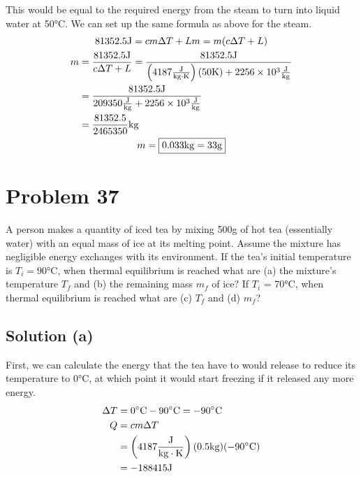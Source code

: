 \documentclass[12pt]{article}
\begin{document}
        This would be equal to the required energy from the steam to turn into liquid water at 50\unit{\celsius}.
        We can set up the same formula as above for the steam.
        \begin{gather}
            81352.5 \unit{\joule}   =   cm\Delta T + Lm = m(c\Delta T + L)\\
            \begin{align}
                m   &=  \frac{81352.5 \unit{\joule}}{c\Delta T + L}
                    =   \frac{81352.5 \unit{\joule}}{\left( 4187 \unit{\frac{\joule}{\kilo\gram\cdot\kelvin}} \right)(50\unit{\kelvin}) + 2256 \times 10^{3} \unit{\frac{\joule}{\kilo\gram}} }\\
                    &=  \frac{81352.5 \unit{\joule}}{ 209350 \unit{\frac{\joule}{\kilo\gram}} + 2256 \times 10^{3} \unit{\frac{\joule}{\kilo\gram}} }\\
                    &=  \frac{81352.5}{2465350} \unit{\kilo\gram}
            \end{align}\\
            m   =   \boxed{0.033 \unit{\kilo\gram} = 33 \unit{\gram}}
        \end{gather}

    \pagebreak
    \section{Problem 37}
        A person makes a quantity of iced tea by mixing 500\unit{\gram} of hot tea (essentially water) with an equal mass of ice at its melting point. 
        Assume the mixture has negligible energy exchanges with its environment. 
        If the tea's initial temperature is $T_i = 90\unit{\celsius}$, when thermal equilibrium is reached what are (a) the mixture's temperature $T_f$ and (b) the remaining mass $m_f$ of ice? If $T_i$ = 70°C, when thermal equilibrium is reached what are (c) $T_f$ and (d) $m_f$?

        \subsection{Solution (a)}
            First, we can calculate the energy that the tea have to would release to reduce its temperature to 0\unit{\celsius}, at which point it would start freezing if it released any more energy. 
            \begin{align}
                \Delta T    &=  0 \unit{\celsius} - 90 \unit{\celsius} = -90 \unit{\celsius}\\
                Q   &=  cm\Delta T\\
                    &=  \left( 4187 \unit{\frac{\joule}{\kilo\gram\cdot\kelvin}} \right) (0.5 \unit{\kilo\gram}) (-90 \unit{\celsius})\\
                    &=  -188415 \unit{\joule}
            \end{align}
\end{document}
